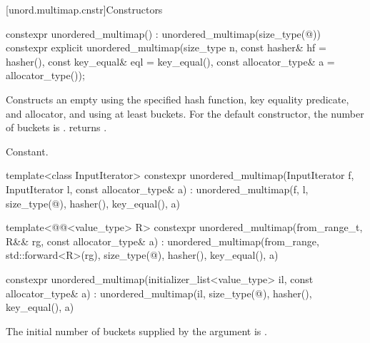 [unord.multimap.cnstr]{Constructors}

%
\begin{itemdecl}
constexpr unordered_multimap() : unordered_multimap(size_type(@\seebelow@)) { }
constexpr explicit unordered_multimap(size_type n, const hasher& hf = hasher(),
                                      const key_equal& eql = key_equal(),
                                      const allocator_type& a = allocator_type());
\end{itemdecl}

\begin{itemdescr}
\pnum
\effects
Constructs an empty  using the
specified hash function, key equality predicate, and allocator, and
using at least  buckets.  For the default constructor,
the number of buckets is .
 returns .

\pnum
\complexity
Constant.
\end{itemdescr}

%
\begin{itemdecl}
template<class InputIterator>
  constexpr unordered_multimap(InputIterator f, InputIterator l, const allocator_type& a)
    : unordered_multimap(f, l,
                         size_type(@\seebelow@), hasher(), key_equal(), a) { }

template<@@<value_type> R>
  constexpr unordered_multimap(from_range_t, R&& rg, const allocator_type& a)
    : unordered_multimap(from_range, std::forward<R>(rg),
                         size_type(@\seebelow@), hasher(), key_equal(), a) { }

constexpr unordered_multimap(initializer_list<value_type> il, const allocator_type& a)
  : unordered_multimap(il, size_type(@\seebelow@), hasher(), key_equal(), a) { }
\end{itemdecl}

\begin{itemdescr}
\pnum
\remarks
The initial number of buckets supplied by the  argument is
.
\end{itemdescr}

